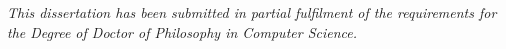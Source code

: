 
\vspace*{\fill}
\vspace*{\fill}
\vspace*{\fill}
\begin{center}
\textit{
This dissertation has been submitted in partial fulfilment of
the requirements for the Degree of Doctor of Philosophy in
Computer Science.
}
\end{center}

\vspace*{\fill}
\vspace*{\fill}
\vspace*{\fill}
